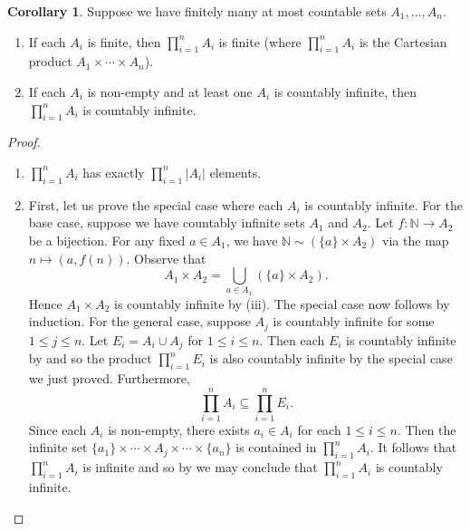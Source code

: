 \documentclass[12pt]{article}
\theoremstyle{definition}
\newtheorem{corollary}[definition]{Corollary}
\begin{document}
\begin{corollary}
\label{cor:finite_product_of_amc_sets_is_amc}
    Suppose we have finitely many at most countable sets \( A_1, \ldots, A_n \).
    \begin{enumerate}[label = (\roman*)]
        \item If each \( A_i \) is finite, then \( \prod_{i=1}^n A_i \) is finite (where \( \prod_{i=1}^n A_i \) is the Cartesian product \( A_1 \times \cdots \times A_n \)).

        \item If each \( A_i \) is non-empty and at least one \( A_i \) is countably infinite, then \( \prod_{i=1}^n A_i \) is countably infinite.
    \end{enumerate}
\end{corollary}

\begin{proof}
    \begin{enumerate}[label = (\roman*)]
        \item \( \prod_{i=1}^n A_i \) has exactly \( \prod_{i=1}^n |A_i| \) elements.

        \item First, let us prove the special case where each \( A_i \) is countably infinite. For the base case, suppose we have countably infinite sets \( A_1 \) and \( A_2 \). Let \( f : \mathbb{N} \to A_2 \) be a bijection. For any fixed \( a \in A_1 \), we have \( \mathbb{N} \sim (\{ a \} \times A_2) \) via the map \( n \mapsto (a, f(n)) \). Observe that
        \[
            A_1 \times A_2 = \bigcup_{a \in A_1} (\{ a \} \times A_2).
        \]
        Hence \( A_1 \times A_2 \) is countably infinite by  (iii). The special case now follows by induction. For the general case, suppose \( A_j \) is countably infinite for some \( 1 \leq j \leq n \). Let \( E_i = A_i \cup A_j \) for \( 1 \leq i \leq n \). Then each \( E_i \) is countably infinite by  and so the product \( \prod_{i=1}^n E_i \) is also countably infinite by the special case we just proved. Furthermore,
        \[
            \prod_{i=1}^n A_i \subseteq \prod_{i=1}^n E_i.
        \]
        Since each \( A_i \) is non-empty, there exists \( a_i \in A_i \) for each \( 1 \leq i \leq n \). Then the infinite set \( \{ a_1 \} \times \cdots \times A_j \times \cdots \times \{ a_n \} \) is contained in \( \prod_{i=1}^n A_i \). It follows that \( \prod_{i=1}^n A_i \) is infinite and so by  we may conclude that \( \prod_{i=1}^n A_i \) is countably infinite. \qedhere
    \end{enumerate}
\end{proof}
\end{document}
